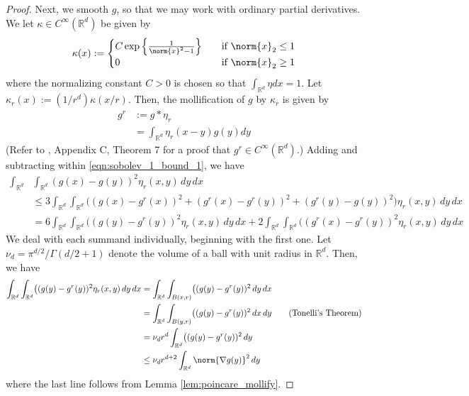 \documentclass{article}
\newcommand{\Reals}{\mathbb{R}}
\newcommand{\1}{\mathbf{1}}
\newcommand{\Rd}{\Reals^d}
\theoremstyle{alden}
\theoremstyle{aldenthm}
\theoremstyle{definition}
\theoremstyle{remark}
\begin{document}
\begin{proof}
	Next, we smooth $g$, so that we may work with ordinary partial derivatives.
	We let $\kappa \in C^{\infty}(\Rd)$ be given by
	\begin{equation*}
	\kappa(x) :=
	\begin{cases}
	C \exp \left\{\frac{1}{\norm{x}^2 - 1}\right\}& \quad \textrm{if $\norm{x}_2 \leq 1$} \\
	0 & \quad \textrm{if $\norm{x}_2 \geq 1$}
	\end{cases}
	\end{equation*}
	where the normalizing constant $C > 0$ is chosen so that $\int_{\Rd} \eta dx = 1$. Let $\kappa_r(x) := (1/r^d) \kappa(x/r)$. Then, the mollification of $g$ by $\kappa_r$ is given by
	\begin{align*}
	g^r & := g \ast \eta_r \\
	& = \int_{\Rd} \eta_r(x - y) g(y) dy
	\end{align*}
	(Refer to \citep{evans10}, Appendix C, Theorem 7 for a proof that $g^r \in C^{\infty}(\Rd)$.)
	Adding and subtracting within \eqref{eqn:sobolev_1_bound_1}, we have
	\begin{align}
	\int_{\Rd} & \int_{\Rd} (g(x) - g(y))^2\eta_r(x,y) \,dy \,dx \\
	& \leq 3 \int_{\Rd} \int_{\Rd} \bigl((g(x) - g^r(x))^2 + (g^r(x) - g^r(y))^2 + (g^r(y) - g(y))^2\bigr)\eta_r(x,y) \,dy \,dx \nonumber \\
	& = 6 \int_{\Rd} \int_{\Rd} \bigl((g(y) - g^r(y))^2 \eta_r(x,y) \,dy \,dx + 2 \int_{\Rd} \int_{\Rd} \bigl((g^r(x) - g^r(y))^2 \eta_r(x,y) \,dy \,dx \label{eqn:sobolev_1_bound_5}
	\end{align}
	We deal with each summand individually, beginning with the first one. Let $\nu_d = \pi^{d/2}/\Gamma(d/2 + 1)$ denote the volume of a ball with unit radius in $\Rd$. Then, we have
	\begin{align}
	\int_{\Rd} \int_{\Rd} \bigl((g(y) - g^r(y))^2 \eta_r(x,y) \,dy \,dx & = \int_{\Rd} \int_{B(x,r)} \bigl((g(y) - g^r(y))^2\,dy \,dx \nonumber \\
	& = \int_{\Rd} \int_{B(y,r)} \bigl((g(y) - g^r(y))^2\,dx \,dy \tag{Tonelli's Theorem} \nonumber \\
	& = \nu_d r^d \int_{\Rd}\bigl((g(y) - g^r(y))^2 \,dy \\
	& \leq \nu_d r^{d + 2} \int_{\Rd} \norm{\nabla g(y)}^2 \,dy \label{eqn:sobolev_1_bound_4}
	\end{align}
	where the last line follows from Lemma \ref{lem:poincare_mollify}.
	

\end{proof}
\end{document}
